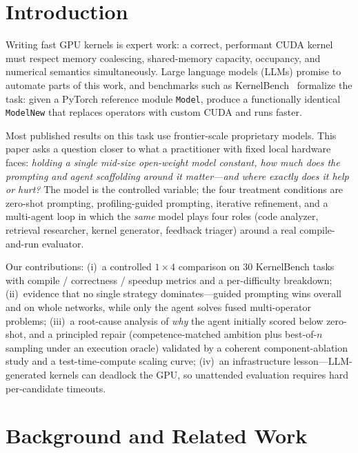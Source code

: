 \documentclass[conference]{IEEEtran}
\begin{document}
\section{Introduction}

Writing fast GPU kernels is expert work: a correct, performant CUDA kernel must
respect memory coalescing, shared-memory capacity, occupancy, and numerical
semantics simultaneously. Large language models (LLMs) promise to automate parts of
this work, and benchmarks such as KernelBench~\cite{kernelbench} formalize the task:
given a PyTorch reference module \texttt{Model}, produce a functionally identical
\texttt{ModelNew} that replaces operators with custom CUDA and runs faster.

Most published results on this task use frontier-scale proprietary models. This
paper asks a question closer to what a practitioner with fixed local hardware faces:
\emph{holding a single mid-size open-weight model constant, how much does the
prompting and agent scaffolding around it matter---and where exactly does it help or
hurt?} The model is the controlled variable; the four treatment conditions are
zero-shot prompting, profiling-guided prompting, iterative refinement, and a
multi-agent loop in which the \emph{same} model plays four roles (code analyzer,
retrieval researcher, kernel generator, feedback triager) around a real
compile-and-run evaluator.

Our contributions: (i)~a controlled $1{\times}4$ comparison on 30 KernelBench tasks
with compile / correctness / speedup metrics and a per-difficulty breakdown;
(ii)~evidence that no single strategy dominates---guided prompting wins overall and
on whole networks, while only the agent solves fused multi-operator problems;
(iii)~a root-cause analysis of \emph{why} the agent initially scored below
zero-shot, and a principled repair (competence-matched ambition plus best-of-$n$
sampling under an execution oracle) validated by a coherent component-ablation
study and a test-time-compute scaling curve; (iv)~an infrastructure lesson---LLM-generated
kernels can deadlock the GPU, so unattended evaluation requires hard
per-candidate timeouts.

\section{Background and Related Work}
\end{document}
